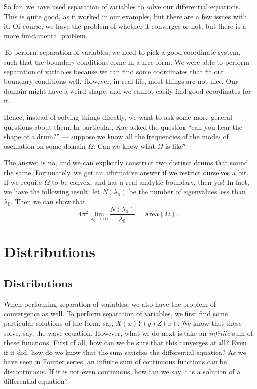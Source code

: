 \documentclass[a4paper]{article}
\begin{document}
So far, we have used separation of variables to solve our differential equations. This is quite good, as it worked in our examples, but there are a few issues with it. Of course, we have the problem of whether it converges or not, but there is a more fundamental problem.

To perform separation of variables, we need to pick a good coordinate system, such that the boundary conditions come in a nice form. We were able to perform separation of variables because we can find some coordinates that fit our boundary conditions well. However, in real life, most things are not nice. Our domain might have a weird shape, and we cannot easily find good coordinates for it.

Hence, instead of solving things directly, we want to ask some more general questions about them. In particular, Kac asked the question ``can you hear the shape of a drum?'' --- suppose we know all the frequencies of the modes of oscillation on some domain $\Omega$. Can we know what $\Omega$ is like?

The answer is no, and we can explicitly construct two distinct drums that sound the same. Fortunately, we get an affirmative answer if we restrict ourselves a bit. If we require $\Omega$ to be convex, and has a real analytic boundary, then yes! In fact, we have the following result: let $N(\lambda_0)$ be the number of eigenvalues less than $\lambda_0$. Then we can show that
\[
  4\pi^2 \lim_{\lambda_0 \to \infty} \frac{N(\lambda_0)}{\lambda_0} = \mathrm{Area}(\Omega).
\]

\section{Distributions}
\subsection{Distributions}
When performing separation of variables, we also have the problem of convergence as well. To perform separation of variables, we first find some particular solutions of the form, say, $X(x)Y(y)Z(z)$. We know that these solve, say, the wave equation. However, what we do next is take an \emph{infinite} sum of these functions. First of all, how can we be sure that this converges at all? Even if it did, how do we know that the sum satisfies the differential equation? As we have seen in Fourier series, an infinite sum of continuous functions can be discontinuous. If it is not even continuous, how can we say it is a solution of a differential equation?
\end{document}
